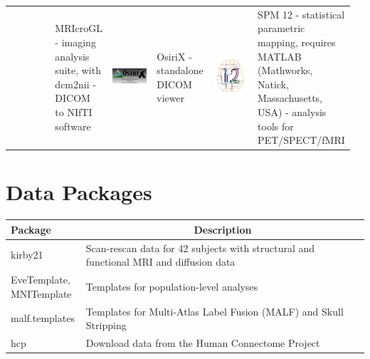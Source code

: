 \documentclass[final]{beamer}\usepackage[]{graphicx}\usepackage[]{color}
\begin{document}
\begin{frame}[fragile]
\begin{table}[!htb]
\begin{minipage}{0.40\linewidth}
\begin{tabular}{>{\centering}m{0.16\linewidth}>{\centering}m{0.16\linewidth}|>{\centering}m{0.16\linewidth}>{\centering}m{0.16\linewidth}|>{\centering}m{0.16\linewidth}>{\centering\arraybackslash}m{0.16\linewidth}}
& MRIcroGL - imaging analysis suite, with dcm2nii - DICOM to NIfTI software
& \includegraphics[clip, width=5cm, keepaspectratio]{figures/OsiriX.png}
& OsiriX - standalone DICOM viewer  
& \includegraphics[clip, width=5cm, keepaspectratio]{figures/spm12.png} & SPM 12 - statistical parametric mapping, requires MATLAB (Mathworks, Natick, Massachusetts, USA) - analysis tools for PET/SPECT/fMRI
\end{tabular}

\section{Data Packages}
\begin{center}
\begin{tabular}{>{\centering }m{0.21\linewidth}m{0.79\linewidth}}
Package & \multicolumn{1}{c}{Description} \\ \hline
kirby21 & Scan-rescan data for 42 subjects with structural and functional MRI and diffusion data \citep{kirby} \\
EveTemplate, MNITemplate & Templates for population-level analyses \citep{eve, fonov2011unbiased, fonov2009unbiased}   \\
malf.templates & Templates \citep{bennett2012miccai} for Multi-Atlas Label Fusion (MALF) and Skull Stripping \\
hcp &  Download data from the Human Connectome Project	\citep{hcp}
\end{tabular}
\end{center}






\end{minipage}
\end{table}
\end{frame}
\end{document}

